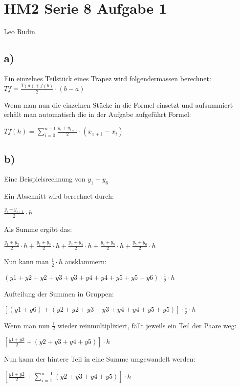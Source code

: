 \documentclass{article}
\begin{document}
\section*{HM2 Serie 8 Aufgabe 1}
Leo Rudin

\subsection*{a)}
Ein einzelnes Teilstück eines Trapez wird folgendermassen berechnet: \(Tf = \frac{T(a) + f(b)}{2} \cdot (b-a)\)

Wenn man nun die einzelnen Stücke in die Formel einsetzt und aufsummiert erhält man automatisch die in der Aufgabe aufgeführt Formel:

\(Tf(h) = \sum_{i=0}^{n-1} \frac{y_i + y_{i+1}}{2} \cdot (x_{x+1} - x_i)\)

\subsection*{b)}
Eine Beispielsrechnung von \(y_1-y_6\)

Ein Abschnitt wird berechnet durch:

\(\frac{y_i + y_{i+1}}{2} \cdot h\)

Als Summe ergibt das:

\(\frac{y_1 + y_2}{2} \cdot h + \frac{y_2 + y_3}{2} \cdot h + \frac{y_3 + y_4}{2} \cdot h + \frac{y_4 + y_5}{2} \cdot h + \frac{y_5 + y_6}{2} \cdot h\)

Nun kann man \(\frac{1}{2} \cdot h\) ausklammern:

\((y1 + y2 + y2 + y3 + y3 + y4 + y4 + y5 + y5 + y6) \cdot \frac{1}{2} \cdot h\)

Aufteilung der Summen in Gruppen:

\([( y1 + y6 ) + (y2 + y2 + y3 + y3 + y4 + y4 + y5 + y5)] \cdot \frac{1}{2} \cdot h\)

Wenn man nun \(\frac{1}{2}\) wieder reinmultipliziert, fällt jeweils ein Teil der Paare weg:

\([\frac{y1+y2}{2} + (y2 + y3 + y4 + y5)] \cdot h\)

Nun kann der hintere Teil in eine Summe umgewandelt werden:

\([\frac{y1+y2}{2} + \sum_{i=1}^{n-1}(y2 + y3 + y4 + y5)] \cdot h\)
\end{document}
